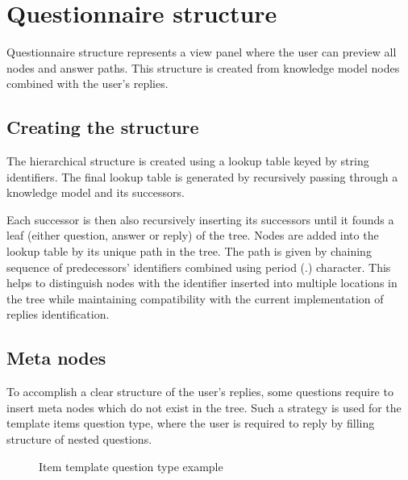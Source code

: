 \section{Questionnaire structure}\label{sec:questionnaire-structure}

Questionnaire structure represents a view panel where the user can preview all nodes and answer paths.
This structure is created from knowledge model nodes combined with the user's replies.

\subsection{Creating the structure}

The hierarchical structure is created using a lookup table keyed by string identifiers.
The final lookup table is generated by recursively passing through a knowledge model and its successors.

Each successor is then also recursively inserting its successors until it founds a leaf (either question, answer or reply) of the tree.
Nodes are added into the lookup table by its unique path in the tree.
The path is given by chaining sequence of predecessors' identifiers combined using period (.) character.
This helps to distinguish nodes with the identifier inserted into multiple locations in the tree while maintaining compatibility with the current implementation of replies identification.

\subsection{Meta nodes}\label{sec:meta-nodes}

To accomplish a clear structure of the user's replies, some questions require to insert meta nodes which do not exist in the tree.
Such a strategy is used for the template items question type, where the user is required to reply by filling structure of nested questions.

\begin{figure}[H]
    \caption{Item template question type example}\label{fig:item-template}
\end{figure}

